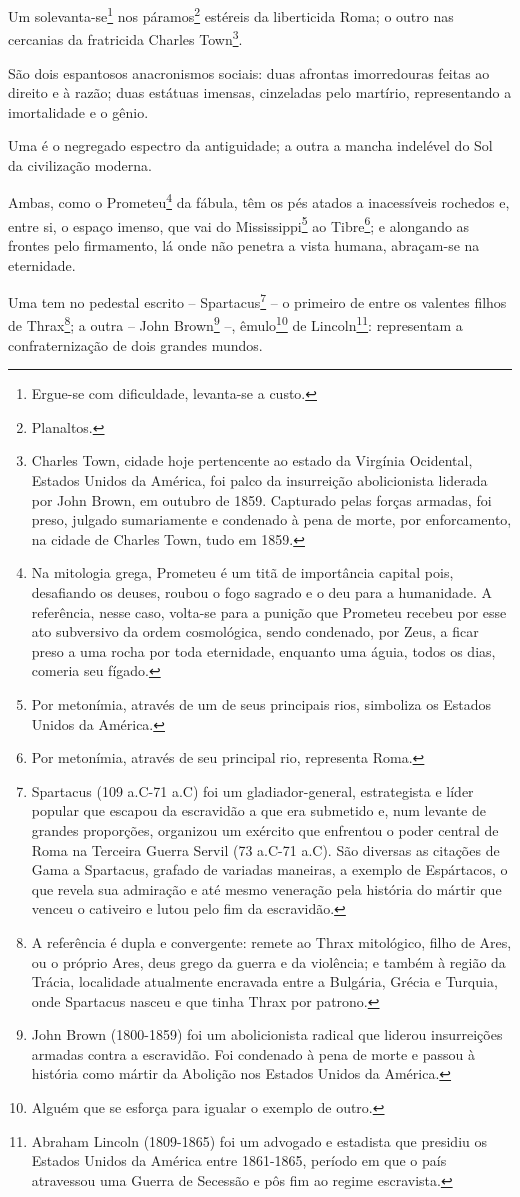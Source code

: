 Um solevanta-se\footnote{Ergue-se com dificuldade, levanta-se a custo.}
nos páramos\footnote{Planaltos.} estéreis da liberticida Roma; o outro
nas cercanias da fratricida Charles Town\footnote{Charles Town, cidade
  hoje pertencente ao estado da Virgínia Ocidental, Estados Unidos da
  América, foi palco da insurreição abolicionista liderada por John
  Brown, em outubro de 1859. Capturado pelas forças armadas, foi preso,
  julgado sumariamente e condenado à pena de morte, por enforcamento, na
  cidade de Charles Town, tudo em 1859.}.

São dois espantosos anacronismos sociais: duas afrontas imorredouras
feitas ao direito e à razão; duas estátuas imensas, cinzeladas pelo
martírio, representando a imortalidade e o gênio.

Uma é o negregado espectro da antiguidade; a outra a mancha indelével do
Sol da civilização moderna.

Ambas, como o Prometeu\footnote{Na mitologia grega, Prometeu é um titã
  de importância capital pois, desafiando os deuses, roubou o fogo
  sagrado e o deu para a humanidade. A referência, nesse caso, volta-se
  para a punição que Prometeu recebeu por esse ato subversivo da ordem
  cosmológica, sendo condenado, por Zeus, a ficar preso a uma rocha por
  toda eternidade, enquanto uma águia, todos os dias, comeria seu
  fígado.} da fábula, têm os pés atados a inacessíveis rochedos e, entre
si, o espaço imenso, que vai do Mississippi\footnote{Por metonímia,
  através de um de seus principais rios, simboliza os Estados Unidos da
  América.} ao Tibre\footnote{Por metonímia, através de seu principal
  rio, representa Roma.}; e alongando as frontes pelo firmamento, lá
onde não penetra a vista humana, abraçam-se na eternidade.

Uma tem no pedestal escrito -- Spartacus\footnote{Spartacus (109
  a.C-71 a.C) foi um gladiador-general, estrategista e líder popular que
  escapou da escravidão a que era submetido e, num levante de grandes
  proporções, organizou um exército que enfrentou o poder central de
  Roma na Terceira Guerra Servil (73 a.C-71 a.C). São diversas as
  citações de Gama a Spartacus, grafado de variadas maneiras, a exemplo
  de Espártacos, o que revela sua admiração e até mesmo veneração pela
  história do mártir que venceu o cativeiro e lutou pelo fim da
  escravidão.} -- o primeiro de entre os valentes filhos de
Thrax\footnote{A referência é dupla e convergente: remete ao Thrax
  mitológico, filho de Ares, ou o próprio Ares, deus grego da guerra e
  da violência; e também à região da Trácia, localidade atualmente
  encravada entre a Bulgária, Grécia e Turquia, onde Spartacus nasceu e
  que tinha Thrax por patrono.}; a outra -- John Brown\footnote{John
  Brown (1800-1859) foi um abolicionista radical que liderou
  insurreições armadas contra a escravidão. Foi condenado à pena de
  morte e passou à história como mártir da Abolição nos Estados Unidos
  da América.} --, êmulo\footnote{Alguém que se esforça para igualar o
  exemplo de outro.} de Lincoln\footnote{Abraham Lincoln (1809-1865)
  foi um advogado e estadista que presidiu os Estados Unidos da América
  entre 1861-1865, período em que o país atravessou uma Guerra de
  Secessão e pôs fim ao regime escravista.}: representam a
confraternização de dois grandes mundos.

